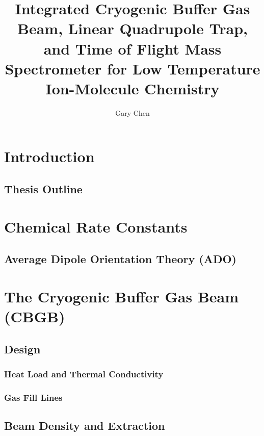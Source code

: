 \documentclass [PhD,nolistoftables,scheader] {uclathes}
\title          {Integrated Cryogenic Buffer Gas Beam, Linear Quadrupole Trap, and Time of Flight Mass Spectrometer for Low Temperature Ion-Molecule Chemistry}
\author         {Gary Chen}
\begin{document}
\makeintropages


\chapter{Introduction}
	
	
	\section{Thesis Outline}
	
	
\chapter{Chemical Rate Constants}
	
	
	\section{Average Dipole Orientation Theory (ADO)}
	

%	

\chapter{The Cryogenic Buffer Gas Beam (CBGB)}


	\section{Design}
	
	
		\subsection{Heat Load and Thermal Conductivity}
		
		
		\subsection{Gas Fill Lines}
		
	
	\section{Beam Density and Extraction} \label{sec: beam density}
	
		
\end{document}

